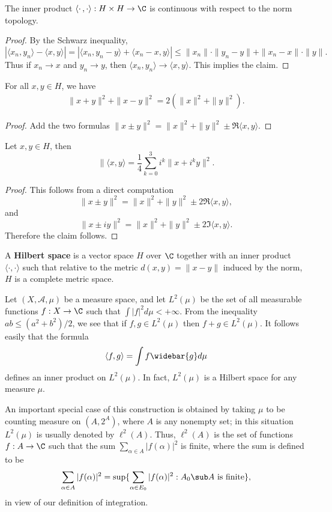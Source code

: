 \begin{proposition}
The inner product $\langle\cdot\,,\cdot\rangle:H\times H\to\C$ is continuous with respect to the norm topology.
\end{proposition}
\begin{proof}
By the Schwarz inequality,
\[|\langle x_n,y_n\rangle-\langle x,y\rangle|=|\langle x_n,y_n-y\rangle+\langle x_n-x,y\rangle|\leq\|x_n\|\cdot\|y_n-y\|+\|x_n-x\|\cdot\|y\|.\]
Thus if $x_n\to x$ and $y_n\to y$, then $\langle x_n,y_n\rangle\to\langle x,y\rangle$. This implies the claim.
\end{proof}
\begin{proposition}
For all $x,y\in H$, we have
\begin{align}\label{parallelogram law}
\|x+y\|^2+\|x-y\|^2=2(\|x\|^2+\|y\|^2).
\end{align}
\end{proposition}
\begin{proof}
Add the two formulas $\|x\pm y\|^2=\|x\|^2+\|y\|^2\pm\Re\langle x,y\rangle$.
\end{proof}
\begin{proposition}
Let $x,y\in H$, then
\[\|\langle x,y\rangle=\frac{1}{4}\sum_{k=0}^{3}i^k\|x+i^ky\|^2.\]
\end{proposition}
\begin{proof}
This follows from a direct computation
\[\|x\pm y\|^2=\|x\|^2+\|y\|^2\pm 2\Re\langle x,y\rangle,\]
and
\[\|x\pm iy\|^2=\|x\|^2+\|y\|^2\pm 2\Im\langle x,y\rangle.\]
Therefore the claim follows.
\end{proof}
\begin{definition}
A \textbf{Hilbert space} is a vector space $H$ over $\C$ together with an inner product $\langle\cdot,\cdot\rangle$ such that relative to the metric $d(x,y)=\|x-y\|$ induced by the norm, $H$ is a complete metric space.
\end{definition}
\begin{example}
Let $(X,\mathcal{A},\mu)$ be a measure space, and let $L^2(\mu)$ be the set of all measurable functions $f:X\to\C$ such that $\int|f|^2d\mu<+\infty$. From the inequality $ab\leq(a^2+b^2)/2$, we see that if $f,g\in L^2(\mu)$ then $f+g\in L^2(\mu)$. It follows easily that the formula
\[\langle f,g\rangle=\int f\widebar{g}d\mu\]
defines an inner product on $L^2(\mu)$. In fact, $L^2(\mu)$ is a Hilbert space for any measure $\mu$.\par
An important special case of this construction is obtained by taking $\mu$ to be counting measure on $(A,2^A)$, where $A$ is any nonempty set; in this situation $L^2(\mu)$ is usually denoted by $\ell^2(A)$. Thus, $\ell^2(A)$ is the set of functions $f:A\to\C$ such that the sum $\sum_{\alpha\in A}|f(\alpha)|^2$ is finite, where the sum is defined to be
\[\sum_{\alpha\in A}|f(\alpha)|^2=\sup\{\sum_{\alpha\in E_0}|f(\alpha)|^2:A_0\sub A\text{ is finite}\},\]
in view of our definition of integration.
\end{example}
